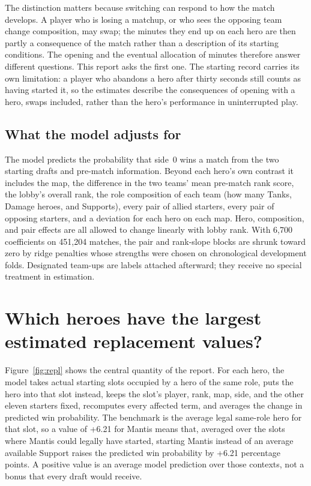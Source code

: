 \documentclass[11pt]{article}
\begin{document}
The distinction matters because switching can respond to how the match develops. A player who is
losing a matchup, or who sees the opposing team change composition, may swap; the minutes they end up on
each hero are then partly a consequence of the match rather than a description of its starting
conditions. The opening and the eventual allocation of minutes therefore answer different questions. This
report asks the first one. The starting record carries its own limitation: a player who abandons a hero
after thirty seconds still counts as having started it, so the estimates describe the consequences of
opening with a hero, swaps included, rather than the hero's performance in uninterrupted play.

\subsection*{What the model adjusts for}

The model predicts the probability that side~0 wins a match from the two starting drafts and pre-match
information. Beyond each hero's own contrast it includes the map, the difference in the two teams' mean
pre-match rank score, the lobby's overall rank, the role composition of each team (how many Tanks, Damage
heroes, and Supports), every pair of allied starters, every pair of opposing starters, and a deviation for
each hero on each map. Hero, composition, and pair effects are all allowed to change linearly with lobby
rank. With 6,700 coefficients on 451,204 matches, the pair and rank-slope blocks are shrunk toward
zero by ridge penalties whose strengths were chosen on chronological development folds. Designated
team-ups are labels attached afterward; they receive no special treatment in estimation.

\section*{Which heroes have the largest estimated replacement values?}

Figure~\ref{fig:repl} shows the central quantity of the report. For each hero,
the model takes actual starting slots occupied by a hero of the same role, puts the hero into that slot
instead, keeps the slot's player, rank, map, side, and the other eleven starters fixed, recomputes every
affected term, and averages the change in predicted win probability. The benchmark is the average legal
same-role hero for that slot, so a value of +6.21 for Mantis means that, averaged over the slots
where Mantis could legally have started, starting Mantis instead of an average available Support raises
the predicted win probability by +6.21 percentage points. A positive value is an average model
prediction over those contexts, not a bonus that every draft would receive.
\end{document}
